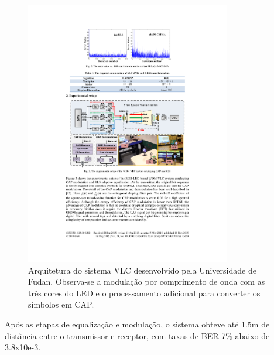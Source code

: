 	\begin{figure}[h]
		\caption{\label{figure:fudan-architecture}Arquitetura do sistema VLC desenvolvido pela Universidade de Fudan. Observa-se a modulação por comprimento de onda com as três cores do LED e o processamento adicional para converter os símbolos em CAP.}
		\centering
		\includegraphics[width=0.8\textwidth, trim={5cm 10cm 5cm 10.1cm},clip]{fudan4.pdf}
	\end{figure}
	
	Após as etapas de equalização e modulação, o sistema obteve até 1.5m de distância entre o transmissor e receptor, com taxas de BER 7\% abaixo de 3.8x10e-3.